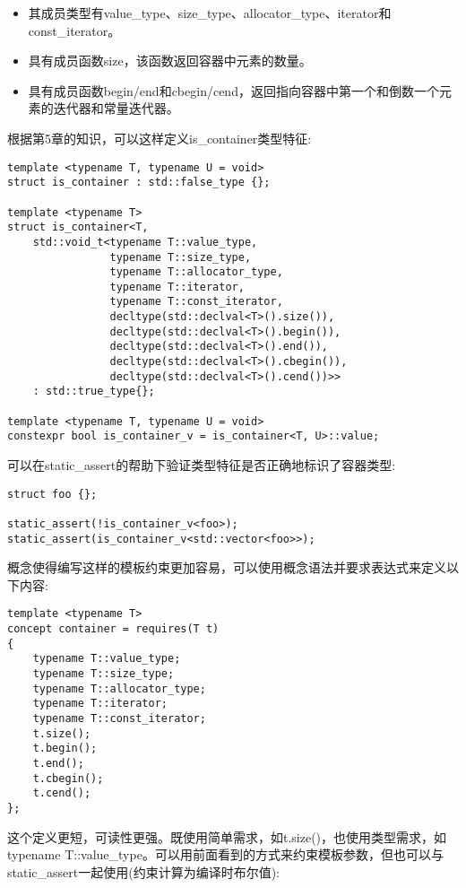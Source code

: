 \begin{itemize}
\item
其成员类型有value\_type、size\_type、allocator\_type、iterator和const\_iterator。

\item
具有成员函数size，该函数返回容器中元素的数量。

\item
具有成员函数begin/end和cbegin/cend，返回指向容器中第一个和倒数一个元素的迭代器和常量迭代器。
\end{itemize}

根据第5章的知识，可以这样定义is\_container类型特征:

\begin{lstlisting}[style=styleCXX]
template <typename T, typename U = void>
struct is_container : std::false_type {};

template <typename T>
struct is_container<T,
	std::void_t<typename T::value_type,
				typename T::size_type,
				typename T::allocator_type,
				typename T::iterator,
				typename T::const_iterator,
				decltype(std::declval<T>().size()),
				decltype(std::declval<T>().begin()),
				decltype(std::declval<T>().end()),
				decltype(std::declval<T>().cbegin()),
				decltype(std::declval<T>().cend())>>
	: std::true_type{};

template <typename T, typename U = void>
constexpr bool is_container_v = is_container<T, U>::value;
\end{lstlisting}

可以在static\_assert的帮助下验证类型特征是否正确地标识了容器类型:

\begin{lstlisting}[style=styleCXX]
struct foo {};

static_assert(!is_container_v<foo>);
static_assert(is_container_v<std::vector<foo>>);
\end{lstlisting}

概念使得编写这样的模板约束更加容易，可以使用概念语法并要求表达式来定义以下内容:

\begin{lstlisting}[style=styleCXX]
template <typename T>
concept container = requires(T t)
{
	typename T::value_type;
	typename T::size_type;
	typename T::allocator_type;
	typename T::iterator;
	typename T::const_iterator;
	t.size();
	t.begin();
	t.end();
	t.cbegin();
	t.cend();
};
\end{lstlisting}

这个定义更短，可读性更强。既使用简单需求，如t.size()，也使用类型需求，如typename T::value\_type。可以用前面看到的方式来约束模板参数，但也可以与static\_assert一起使用(约束计算为编译时布尔值):


